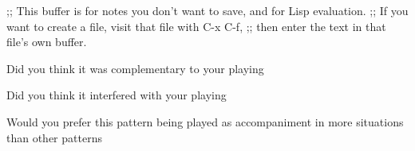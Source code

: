 ;; This buffer is for notes you don't want to save, and for Lisp evaluation.
;; If you want to create a file, visit that file with C-x C-f,
;; then enter the text in that file's own buffer.



Did you think it was complementary to your playing

Did you think it interfered with your playing

Would you prefer this pattern being played as accompaniment in more situations than other patterns




